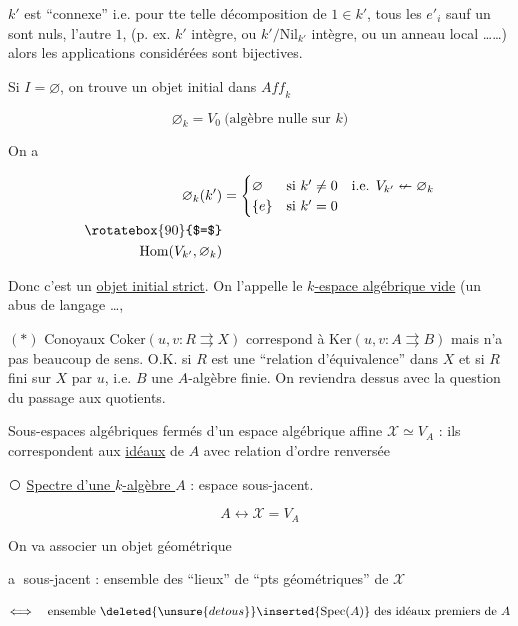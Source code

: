 
$k'$ est ``connexe'' i.e. pour tte telle décomposition de $1\in k'$,  tous les $e'_i$ sauf un sont nuls, l'autre $1$,  (p. ex. $k'$  intègre, ou $k'/\mathrm{Nil}_{k'}$ intègre,  ou  un anneau local \ldots\ldots) alors les applications considérées sont bijectives.


Si $I=\varnothing$, on trouve un objet initial dans $\mathit{Aff}_k$

\[
\varnothing_k=V_0\ \text{(algèbre nulle sur $k$)}
\]

On a 

\[
\begin{aligned}
\varnothing_k(k')&=\begin{cases}
\varnothing&\text{si }k'\ne0 \quad\text{i.e. }V_{k'}\nleftarrow\varnothing_k\\
\{e\}&\text{si }k'=0
\end{cases}\\
\rotatebox{90}{$=$}&\\
\mathrm{Hom}(V_{k'},\varnothing_k)&
\end{aligned}
\]

Donc c'est un \uline{objet initial strict}. On l'appelle le \uline{$k$-espace algébrique vide} (un  abus de langage \ldots,

$(*)$ Conoyaux $\mathrm{Coker}(u,v:R\rightrightarrows X)$ correspond à $\mathrm{Ker}(u,v:A\rightrightarrows B)$ mais n'a pas beaucoup de sens. O.K. si $R$ est une ``relation d'équivalence'' dans $X$ et si $R$ fini sur $X$ par $u$, i.e. $B$ une $A$-algèbre finie. On reviendra dessus avec la question du passage aux quotients.

Sous-espaces algébriques fermés d'un espace algébrique affine $\mathscr X\simeq V_A$ : ils correspondent aux \uline{idéaux} de $A$ avec relation d'ordre renversée

\textcircled{} \uline{Spectre d'une $k$-algèbre $A$} : espace sous-jacent.

\[
A\longleftrightarrow\mathscr X=V_A
\]

On va associer un objet géométrique

\textcircled{a}  sous-jacent : ensemble  des ``lieux''  de ``pts géométriques'' de $\mathscr X$

\[
\Longleftrightarrow\quad\text{ensemble }\deleted{\unsure{de tous}}\inserted{\mathrm{Spec}(A)}\ \text{des idéaux premiers de } A
\]

